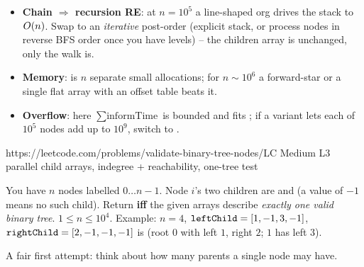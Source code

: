 \begin{hardeningbox}
\begin{itemize}[nosep, leftmargin=1.4em]
  \item \textbf{Chain $\Rightarrow$ recursion RE}: at $n=10^5$ a line-shaped org drives
        the  stack to $O(n)$. Swap to an \emph{iterative} post-order (explicit
        stack, or process nodes in reverse BFS order once you have levels) -- the children
        array is unchanged, only the walk is.
  \item \textbf{Memory}:  is $n$ separate small
        allocations; for $n \sim 10^6$ a forward-star  or a single flat
        array with an offset table beats it.
  \item \textbf{Overflow}: here $\sum\text{informTime}$ is bounded and fits ;
        if a variant lets each of $10^5$ nodes add up to $10^9$, switch to .
\end{itemize}
\end{hardeningbox}

  {https://leetcode.com/problems/validate-binary-tree-nodes/}{LC Medium L3}
  {parallel child arrays, indegree + reachability, one-tree test}

\begin{problemstatement}
You have $n$ nodes labelled $0\dots n-1$. Node $i$'s two children are
 and  (a value of $-1$ means no such child). Return
 \textbf{iff} the given arrays describe \emph{exactly one valid binary tree}.
$1 \le n \le 10^4$. Example: $n=4$, $\texttt{leftChild}=[1,-1,3,-1]$,
$\texttt{rightChild}=[2,-1,-1,-1]$ is  (root $0$ with left $1$, right $2$; $1$ has
left $3$).
\end{problemstatement}

\begin{attemptgate}
A fair first attempt: think about how many parents a single node may have.
\end{attemptgate}

